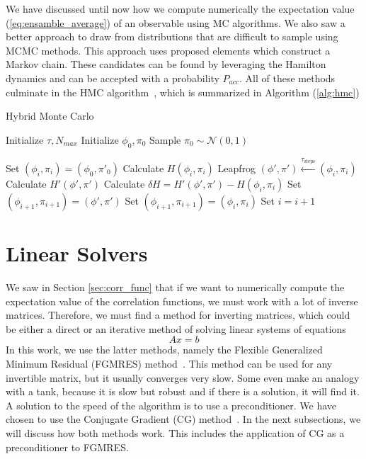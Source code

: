 We have discussed until now how we compute numerically the expectation value (\ref{eq:ensamble_average}) of an observable using MC algorithms. We also saw a better approach to draw from distributions that are difficult to sample using MCMC methods. This approach uses proposed elements which construct a Markov chain. These candidates can be found by leveraging the Hamilton dynamics and can be accepted with a probability $P_{acc}$. All of these methods culminate in the HMC algorithm~\cite{hmc}, which is summarized in Algorithm (\ref{alg:hmc})

\begin{algorithm}
    \caption{Hybrid Monte Carlo}
    \begin{algorithmic}[1]
        \State Initialize  $\tau, N_{max}$
        \State Initialize $\phi_0, \pi_0$
        \State Sample $\pi_0 \sim \mathcal{N}(0,1)$

        \State Set $(\phi_{i}, \pi_{i}) = (\phi_0, \pi'_0)$ 
          
            \State Calculate $H(\phi_{i}, \pi_{i})$
            \State Leapfrog $(\phi', \pi') \xleftarrow{\tau_\text{steps}} (\phi_{i}, \pi_{i})$ 
            \State Calculate $H'(\phi',\pi')$
            \State Calculate $\delta H = H'(\phi',\pi')-H(\phi_{i},\pi_{i})$
             
                \State Set $(\phi_{i+1}, \pi_{i+1}) = (\phi', \pi')$
                \Else
                \State Set $(\phi_{i+1}, \pi_{i+1}) = (\phi_{i}, \pi_{i})$
            \EndIf
        \State Set $i = i + 1$
        \EndWhile
    \end{algorithmic}
    \label{alg:hmc}
    \end{algorithm}

\section{Linear Solvers}

We saw in Section \ref{sec:corr_func} that if we want to numerically compute the expectation value of the correlation functions, we must work with a lot of inverse matrices. Therefore, we must find a method for inverting matrices, which could be either a direct or an iterative method of solving linear systems of equations
\begin{equation}
    Ax = b
    \label{eq:lineq}
\end{equation}
In this work, we use the latter methods, namely the Flexible Generalized Minimum Residual (FGMRES) method~\cite{fgmresart}. This method can be used for any invertible matrix, but it usually converges very slow. Some even make an analogy with a tank, because it is slow but robust and if there is a solution, it will find it. A solution to the speed of the algorithm is to use a preconditioner. We have chosen to use the Conjugate Gradient (CG) method~\cite{cgbook}. In the next subsections, we will discuss how both methods work. This includes the application of CG as a preconditioner to FGMRES.

